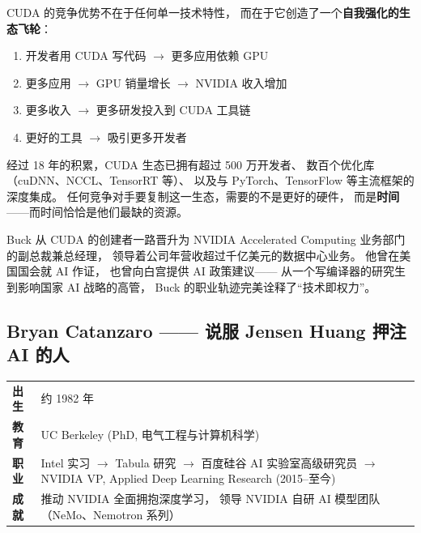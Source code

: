 \begin{whybox}
CUDA 的竞争优势不在于任何单一技术特性，
而在于它创造了一个\textbf{自我强化的生态飞轮}：
\begin{enumerate}[noitemsep]
  \item 开发者用 CUDA 写代码 $\to$ 更多应用依赖 GPU
  \item 更多应用 $\to$ GPU 销量增长 $\to$ NVIDIA 收入增加
  \item 更多收入 $\to$ 更多研发投入到 CUDA 工具链
  \item 更好的工具 $\to$ 吸引更多开发者
\end{enumerate}
经过 18 年的积累，CUDA 生态已拥有超过 500 万开发者、
数百个优化库（cuDNN、NCCL、TensorRT 等）、
以及与 PyTorch、TensorFlow 等主流框架的深度集成。
任何竞争对手要复制这一生态，需要的不是更好的硬件，
而是\textbf{时间}——而时间恰恰是他们最缺的资源。
\end{whybox}

Buck 从 CUDA 的创建者一路晋升为 NVIDIA Accelerated Computing
业务部门的副总裁兼总经理，
领导着公司年营收超过千亿美元的数据中心业务。
他曾在美国国会就 AI 作证，
也曾向白宫提供 AI 政策建议——
从一个写编译器的研究生到影响国家 AI 战略的高管，
Buck 的职业轨迹完美诠释了``技术即权力''。

\subsection{Bryan Catanzaro —— 说服 Jensen Huang 押注 AI 的人}
\label{subsec:catanzaro}

\begin{keybox}
\small
\begin{tabularx}{\textwidth}{lX}
\toprule
\textbf{出生} & 约 1982 年 \\
\textbf{教育} & UC Berkeley (PhD, 电气工程与计算机科学) \\
\textbf{职业} & Intel 实习 $\to$ Tabula 研究 $\to$
                百度硅谷 AI 实验室高级研究员 $\to$
                NVIDIA VP, Applied Deep Learning Research (2015--至今) \\
\textbf{成就} & 推动 NVIDIA 全面拥抱深度学习，
                领导 NVIDIA 自研 AI 模型团队（NeMo、Nemotron 系列） \\
\bottomrule
\end{tabularx}
\end{keybox}

